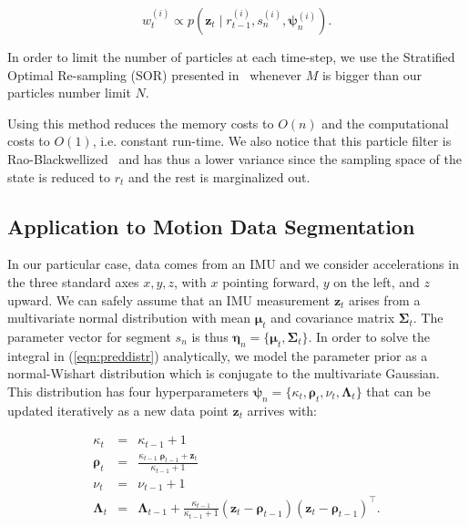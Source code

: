\begin{equation}
\label{eqn:weight}
w_t^{(i)} \propto p(\mathbf{z}_t\mid r_{t-1}^{(i)},s_n^{(i)},
\boldsymbol{\psi}_{n}^{(i)}).
\end{equation}

In order to limit the number of particles at each time-step, we use the
Stratified Optimal Re-sampling (SOR) presented in~\cite{fearnhead07online}
whenever $M$ is bigger than our particles number limit $N$.

Using this method reduces the memory costs to $O(n)$ and the computational costs
to $O(1)$, i.e. constant run-time. We also notice that this particle filter is
Rao-Blackwellized~\cite{casella96rao} and has thus a lower variance since the
sampling space of the state is reduced to $r_t$ and the rest is marginalized out.

\subsection{Application to Motion Data Segmentation}
In our particular case, data comes from an IMU and we consider accelerations in
the three standard axes $x,y,z$, with $x$ pointing forward, $y$ on the left, and
$z$ upward. We can safely assume that an IMU measurement $\mathbf{z}_t$ arises
from a multivariate normal distribution with mean $\boldsymbol{\mu}_t$ and
covariance matrix $\boldsymbol{\Sigma}_t$. The parameter vector for segment
$s_n$ is thus
$\boldsymbol{\eta}_{n}=\{\boldsymbol{\mu}_t,\boldsymbol{\Sigma}_t\}$. In order
to solve the integral in (\ref{eqn:preddistr}) analytically, we model the
parameter prior as a normal-Wishart distribution which is conjugate to the
multivariate Gaussian. This distribution has four hyperparameters
$\boldsymbol{\psi}_{n}=\{\kappa_t,\boldsymbol{\rho}_t,\nu_t,
\boldsymbol{\Lambda}_t\}$ that can be updated iteratively as a new data point
$\mathbf{z}_t$ arrives with:

\begin{eqnarray}
\label{eqn:hyperupdate}
\kappa_t &=& \kappa_{t-1} + 1\nonumber\\
  \boldsymbol{\rho}_t &=& \frac{\kappa_{t-1}\;\boldsymbol{\rho}_{t-1} +
\mathbf{z}_t}{\kappa_{t-1} + 1}\nonumber\\
\nu_t &=& \nu_{t-1} + 1\nonumber\\
\boldsymbol{\Lambda}_t &=& \boldsymbol{\Lambda}_{t-1} +
  \frac{\kappa_{t-1}}{\kappa_{t-1} + 1}
  (\mathbf{z}_t - \boldsymbol{\rho}_{t-1})
  (\mathbf{z}_t - \boldsymbol{\rho}_{t-1})^\intercal.
\end{eqnarray}

